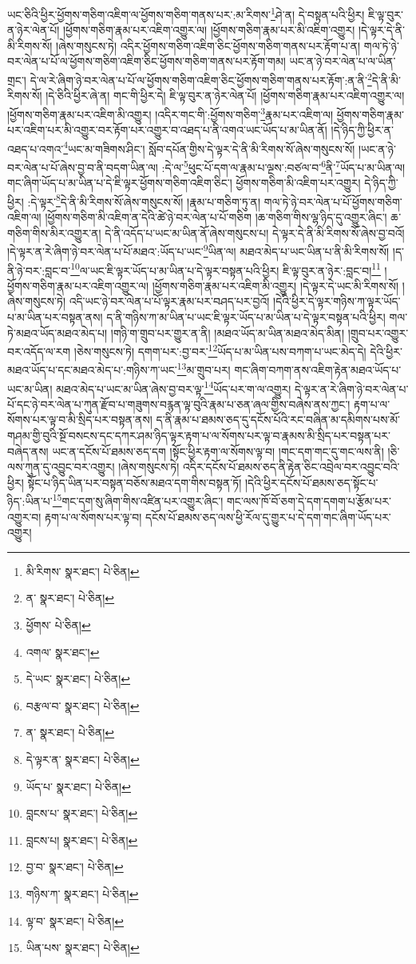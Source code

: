 ཡང་ཅིའི་ཕྱིར་ཕྱོགས་གཅིག་འཇིག་ལ་ཕྱོགས་གཅིག་གནས་པར་:མ་རིགས་\footnote{མི་རིགས་  སྣར་ཐང་།  པེ་ཅིན། }ཤེ་ན། དེ་བསྟན་པའི་ཕྱིར། ཇི་ལྟ་བུར་ན་ཉེར་ལེན་པོ། །ཕྱོགས་གཅིག་རྣམ་པར་འཇིག་འགྱུར་ལ། །ཕྱོགས་གཅིག་རྣམ་པར་མི་འཇིག་འགྱུར། །དེ་ལྟར་དེ་ནི་མི་རིགས་སོ། །ཞེས་གསུངས་ཏེ། འདིར་ཕྱོགས་གཅིག་འཇིག་ཅིང་ཕྱོགས་གཅིག་གནས་པར་རྟོག་པ་ན། གལ་ཏེ་ཉེ་བར་ལེན་པ་པོ་ལ་ཕྱོགས་གཅིག་འཇིག་ཅིང་ཕྱོགས་གཅིག་གནས་པར་རྟོག་གམ། ཡང་ན་ཉེ་བར་ལེན་པ་ལ་ཡིན་གྲང་། དེ་ལ་རེ་ཞིག་ཉེ་བར་ལེན་པ་པོ་ལ་ཕྱོགས་གཅིག་འཇིག་ཅིང་ཕྱོགས་གཅིག་གནས་པར་རྟོག་:ན་ནི་\footnote{ན་  སྣར་ཐང་།  པེ་ཅིན། }དེ་ནི་མི་རིགས་སོ། །དེ་ཅིའི་ཕྱིར་ཞེ་ན། གང་གི་ཕྱིར་དེ། ཇི་ལྟ་བུར་ན་ཉེར་ལེན་པོ། །ཕྱོགས་གཅིག་རྣམ་པར་འཇིག་འགྱུར་ལ། །ཕྱོགས་གཅིག་རྣམ་པར་འཇིག་མི་འགྱུར། །འདིར་གང་གི་:ཕྱོགས་གཅིག་\footnote{ཕྱོགས་  པེ་ཅིན། }རྣམ་པར་འཇིག་ལ། ཕྱོགས་གཅིག་རྣམ་པར་འཇིག་པར་མི་འགྱུར་བར་རྟོག་པར་འགྱུར་བ་འཐད་པ་ནི་འགའ་ཡང་ཡོད་པ་མ་ཡིན་ནོ། །དེ་ཉིད་ཀྱི་ཕྱིར་ན་འཐད་པ་འགའ་\footnote{འགལ་  སྣར་ཐང་། }ཡང་མ་གཟིགས་ཤིང་། སློབ་དཔོན་གྱིས་དེ་ལྟར་དེ་ནི་མི་རིགས་སོ་ཞེས་གསུངས་སོ། །ཡང་ན་ཉེ་བར་ལེན་པ་པོ་ཞེས་བྱ་བ་ནི་བདག་ཡིན་ལ། :དེ་ལ་\footnote{དེ་ཡང་  སྣར་ཐང་།  པེ་ཅིན། }ཕུང་པོ་དག་ལ་རྣམ་པ་ལྔས་:བཙལ་བ་\footnote{བརྩལ་བ་  སྣར་ཐང་།  པེ་ཅིན། }ནི་\footnote{ན་  སྣར་ཐང་།  པེ་ཅིན། }ཡོད་པ་མ་ཡིན་ལ། གང་ཞིག་ཡོད་པ་མ་ཡིན་པ་དེ་ཇི་ལྟར་ཕྱོགས་གཅིག་འཇིག་ཅིང་། ཕྱོགས་གཅིག་མི་འཇིག་པར་འགྱུར། དེ་ཉིད་ཀྱི་ཕྱིར། :དེ་ལྟར་\footnote{དེ་ལྟར་ན་  སྣར་ཐང་།  པེ་ཅིན། }དེ་ནི་མི་རིགས་སོ་ཞེས་གསུངས་སོ། །རྣམ་པ་གཅིག་ཏུ་ན། གལ་ཏེ་ཉེ་བར་ལེན་པ་པོ་ཕྱོགས་གཅིག་འཇིག་ལ། །ཕྱོགས་གཅིག་མི་འཇིག་ན་དེའི་ཚེ་ཉེ་བར་ལེན་པ་པོ་གཅིག །ཆ་གཅིག་གིས་ལྷ་ཉིད་དུ་འགྱུར་ཞིང་། ཆ་གཅིག་གིས་མིར་འགྱུར་ན། དེ་ནི་འདོད་པ་ཡང་མ་ཡིན་ནོ་ཞེས་གསུངས་པ། དེ་ལྟར་དེ་ནི་མི་རིགས་སོ་ཞེས་བྱ་བའོ། །དེ་ལྟར་ན་རེ་ཞིག་ཉེ་བར་ལེན་པ་པོ་མཐའ་:ཡོད་པ་ཡང་\footnote{ཡོད་པ་  སྣར་ཐང་།  པེ་ཅིན། }ཡིན་ལ། མཐའ་མེད་པ་ཡང་ཡིན་པ་ནི་མི་རིགས་སོ། །ད་ནི་ཉེ་བར་:བླང་བ་\footnote{བླངས་པ་  སྣར་ཐང་།  པེ་ཅིན། }ལ་ཡང་ཇི་ལྟར་ཡོད་པ་མ་ཡིན་པ་དེ་ལྟར་བསྟན་པའི་ཕྱིར། ཇི་ལྟ་བུར་ན་ཉེར་:བླང་བ།\footnote{བླངས་པ།  སྣར་ཐང་།  པེ་ཅིན། } །ཕྱོགས་གཅིག་རྣམ་པར་འཇིག་འགྱུར་ལ། །ཕྱོགས་གཅིག་རྣམ་པར་འཇིག་མི་འགྱུར། །དེ་ལྟར་དེ་ཡང་མི་རིགས་སོ། །ཞེས་གསུངས་ཏེ། འདི་ཡང་ཉེ་བར་ལེན་པ་པོ་ལྟར་རྣམ་པར་བཤད་པར་བྱའོ། །དེའི་ཕྱིར་དེ་ལྟར་གཉིས་ཀ་ལྟར་ཡོད་པ་མ་ཡིན་པར་བསྟན་ནས། ད་ནི་གཉིས་ཀ་མ་ཡིན་པ་ཡང་ཇི་ལྟར་ཡོད་པ་མ་ཡིན་པ་དེ་ལྟར་བསྟན་པའི་ཕྱིར། གལ་ཏེ་མཐའ་ཡོད་མཐའ་མེད་པ། །གཉི་ག་གྲུབ་པར་གྱུར་ན་ནི། །མཐའ་ཡོད་མ་ཡིན་མཐའ་མེད་མིན། །གྲུབ་པར་འགྱུར་བར་འདོད་ལ་རག །ཅེས་གསུངས་ཏེ། དགག་པར་:བྱ་བར་\footnote{བྱ་བ་  སྣར་ཐང་།  པེ་ཅིན། }ཡོད་པ་མ་ཡིན་པས་བཀག་པ་ཡང་མེད་དེ། དེའི་ཕྱིར་མཐའ་ཡོད་པ་དང་མཐའ་མེད་པ་:གཉིས་ཀ་ཡང་\footnote{གཉིས་ཀ་  སྣར་ཐང་།  པེ་ཅིན། }མ་གྲུབ་པར། གང་ཞིག་བཀག་ནས་འཇིག་རྟེན་མཐའ་ཡོད་པ་ཡང་མ་ཡིན། མཐའ་མེད་པ་ཡང་མ་ཡིན་ཞེས་བྱ་བར་ལྟ་\footnote{ལྟ་བ་  སྣར་ཐང་།  པེ་ཅིན། }ཡོད་པར་ག་ལ་འགྱུར། དེ་ལྟར་ན་རེ་ཞིག་ཉེ་བར་ལེན་པ་པོ་དང་ཉེ་བར་ལེན་པ་ཀུན་རྫོབ་པ་གཟུགས་བརྙན་ལྟ་བུའི་རྣམ་པ་ཅན་ཞལ་གྱིས་བཞེས་ནས་ཀྱང་། རྟག་པ་ལ་སོགས་པར་ལྟ་བ་མི་སྲིད་པར་བསྟན་ནས། ད་ནི་རྣམ་པ་ཐམས་ཅད་དུ་དངོས་པོའི་རང་བཞིན་མ་དམིགས་པས་མོ་གཤམ་གྱི་བུའི་སྔོ་བསངས་དང་དཀར་ཤམ་ཉིད་ལྟར་རྟག་པ་ལ་སོགས་པར་ལྟ་བ་རྣམས་མི་སྲིད་པར་བསྟན་པར་བཞེད་ནས། ཡང་ན་དངོས་པོ་ཐམས་ཅད་དག །སྟོང་ཕྱིར་རྟག་ལ་སོགས་ལྟ་བ། །གང་དག་གང་དུ་གང་ལས་ནི། །ཅི་ལས་ཀུན་དུ་འབྱུང་བར་འགྱུར། །ཞེས་གསུངས་ཏེ། འདིར་དངོས་པོ་ཐམས་ཅད་ནི་རྟེན་ཅིང་འབྲེལ་བར་འབྱུང་བའི་ཕྱིར། སྟོང་པ་ཉིད་ཡིན་པར་བསྟན་བཅོས་མཐའ་དག་གིས་བསྟན་ཏོ། །དེའི་ཕྱིར་དངོས་པོ་ཐམས་ཅད་སྟོང་པ་ཉིད་:ཡིན་པ་\footnote{ཡིན་པས་  སྣར་ཐང་།  པེ་ཅིན། }གང་དག་སུ་ཞིག་གིས་འཛིན་པར་འགྱུར་ཞིང་། གང་ལས་ཁོ་བོ་ཅག་དེ་དག་དགག་པ་རྩོམ་པར་འགྱུར་བ། རྟག་པ་ལ་སོགས་པར་ལྟ་བ། དངོས་པོ་ཐམས་ཅད་ལས་ཕྱི་རོལ་དུ་གྱུར་པ་དེ་དག་གང་ཞིག་ཡོད་པར་འགྱུར། 